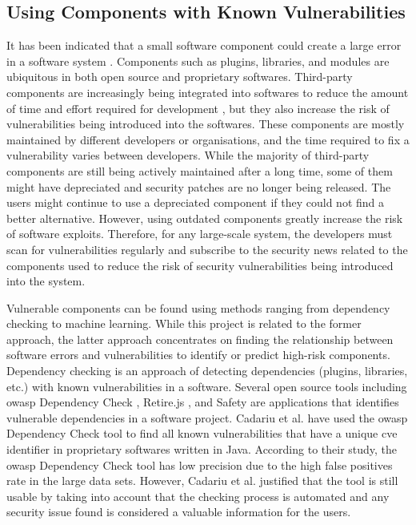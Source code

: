 \documentclass[12pt, a4paper]{report}
\begin{document}
\subsection{Using Components with Known Vulnerabilities} \label{subsec:components}
It has been indicated that a small software component could create a large error in a software
system \cite{basili_1984, munson_1992, selby_1988}. Components such as plugins, libraries, and
modules are ubiquitous in both open source and proprietary softwares. Third-party components are
increasingly being integrated into softwares to reduce the amount of time and effort required for
development \cite{balzarotti_2006}, but they also increase the risk of vulnerabilities being
introduced into the softwares. These components are mostly maintained by different developers or
organisations, and the time required to fix a vulnerability varies between developers. While the
majority of third-party components are still being actively maintained after a long time, some of
them might have depreciated and security patches are no longer being released. The users might
continue to use a depreciated component if they could not find a better alternative. However, using
outdated components greatly increase the risk of software exploits. Therefore, for any large-scale
system, the developers must scan for vulnerabilities regularly and subscribe to the security news
related to the components used to reduce the risk of security vulnerabilities being introduced into
the system.

Vulnerable components can be found using methods ranging from dependency checking to machine
learning. While this project is related to the former approach, the latter approach concentrates on
finding the relationship between software errors and vulnerabilities to identify or predict
high-risk components. Dependency checking is an approach of detecting dependencies (plugins,
libraries, etc.) with known vulnerabilities in a software. Several open source tools including
\acrshort{owasp} Dependency Check \cite{owasp_dependency}, Retire.js \cite{retirejs}, and Safety
\cite{safety} are applications that identifies vulnerable dependencies in a software project.
Cadariu et al. \cite{cadariu_2015} have used the \acrshort{owasp} Dependency Check tool to find all
known vulnerabilities that have a unique \acrshort{cve} identifier in proprietary softwares written
in Java. According to their study, the \acrshort{owasp} Dependency Check tool has low precision due
to the high false positives rate in the large data sets. However, Cadariu et al. \cite{cadariu_2015}
justified that the tool is still usable by taking into account that the checking process is
automated and any security issue found is considered a valuable information for the users.
\end{document}
